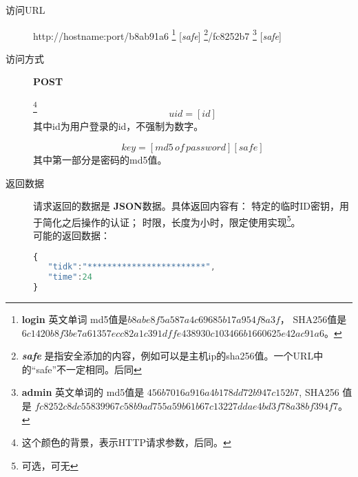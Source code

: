 \documentclass[UTF8]{article}
\def\safe{[\textit{safe}]}
\def\POST{\textbf{POST}}
\def\bfJSON{\textbf{JSON}}
\def\viaurl#1{\item[访问URL] #1}
\def\viareq#1{\item[访问方式] #1}
\def\rtdata{\item[返回数据]}
\begin{document}
    \begin{description}

        \viaurl http://hostname:port/b8ab91a6
        \footnote{
            \textbf{login} 英文单词 md5值是$b8abe8f5a587a4c69685b17a954f8a3f$，
            SHA256值是
            $6c1420b8f3be7a61357ecc82a1c391dffe438930c103466b1660625e42ac91a6$。
        }
        \safe
        \footnote{\textit{\textbf{safe}} 是指安全添加的内容，例如可以是主机ip的sha256值。一个URL中的“safe”不一定相同。后同}/fc8252b7
        \footnote{
            \textbf{admin} 英文单词的
            md5值是 $456b7016a916a4b178dd72b947c152b7 $,
            SHA256 值是
            $fc8252c8dc55839967c58b9ad755a59b61b67c13227ddae4bd3f78a38bf394f7$。
        }
        \safe

        \viareq \POST

        \label{par:id}
        \footnote{这个颜色的背景，表示HTTP请求参数，后同。}
        $$uid=[id]$$
        其中id为用户登录的id，不强制为数字。

        \label{par:key}
         $$key=[md5\, of\, password][safe]$$
         其中第一部分是密码的md5值。

        \rtdata 请求返回的数据是 \bfJSON 数据。具体返回内容有：
        特定的临时ID密钥，用于简化之后操作的认证；
        时限，长度为小时，限定使用实现\footnote{可选，可无}。
         \\ 可能的返回数据：
        \begin{lstlisting}[language=JavaScript]
{
   "tidk":"************************",
   "time":24
}
        \end{lstlisting}


    \end{description}
\end{document}
